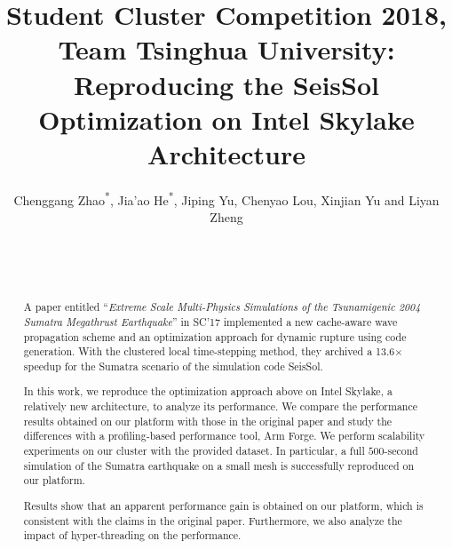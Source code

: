 \documentclass[5p,times]{sig-alternate-05-2015}
\begin{document}
\doi{}

\title{Student Cluster Competition 2018, Team Tsinghua University: Reproducing the SeisSol Optimization on Intel Skylake Architecture}
\newcommand\OriginalPaper{the Sumatra paper}

\author{
\alignauthor
Chenggang Zhao\textsuperscript{*}, Jia'ao He\textsuperscript{*}, Jiping Yu, Chenyao Lou, Xinjian Yu and Liyan Zheng\\
\vspace{5pt}
       \\
       \\
\vspace{5pt}
       \\
}

\maketitle

\begin{abstract}

A paper entitled ``\textit{Extreme Scale Multi-Physics Simulations of the Tsunamigenic 2004 Sumatra Megathrust Earthquake}'' in SC'17 implemented a new cache-aware wave propagation scheme and an optimization approach for dynamic rupture using code generation. With the clustered local time-stepping method, they archived a 13.6$\times$ speedup for the Sumatra scenario of the simulation code SeisSol.

In this work, we reproduce the optimization approach above on Intel Skylake, a relatively new architecture, to analyze its performance. We compare the performance results obtained on our platform with those in the original paper and study the differences with a profiling-based performance tool, Arm Forge. We perform scalability experiments on our cluster with the provided dataset. In particular, a full $500$-second simulation of the Sumatra earthquake on a small mesh is successfully reproduced on our platform.

Results show that an apparent performance gain is obtained on our platform, which is consistent with the claims in the original paper. Furthermore, we also analyze the impact of hyper-threading on the performance.

\end{abstract}
\end{document}
